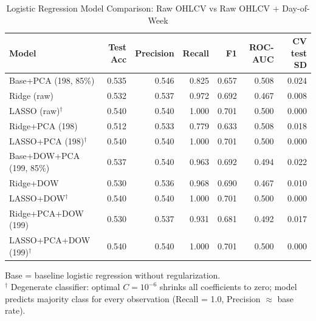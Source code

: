 \begin{table}[htbp]
\centering
\caption{Logistic Regression Model Comparison: Raw OHLCV vs Raw OHLCV + Day-of-Week}
\label{tab:base_logistic_comparison}
\begin{tabular}{lrrrrrr}
\toprule
Model & Test Acc & Precision & Recall & F1 & ROC-AUC & CV test SD \\
\midrule
Base+PCA (198, 85\%) & 0.535 & 0.546 & 0.825 & 0.657 & 0.508 & 0.024 \\
Ridge (raw) & 0.532 & 0.537 & 0.972 & 0.692 & 0.467 & 0.008 \\
LASSO (raw)$^\dagger$ & 0.540 & 0.540 & 1.000 & 0.701 & 0.500 & 0.000 \\
Ridge+PCA (198) & 0.512 & 0.533 & 0.779 & 0.633 & 0.508 & 0.018 \\
LASSO+PCA (198)$^\dagger$ & 0.540 & 0.540 & 1.000 & 0.701 & 0.500 & 0.000 \\
\midrule
Base+DOW+PCA (199, 85\%) & 0.537 & 0.540 & 0.963 & 0.692 & 0.494 & 0.022 \\
Ridge+DOW & 0.530 & 0.536 & 0.968 & 0.690 & 0.467 & 0.010 \\
LASSO+DOW$^\dagger$ & 0.540 & 0.540 & 1.000 & 0.701 & 0.500 & 0.000 \\
Ridge+PCA+DOW (199) & 0.530 & 0.537 & 0.931 & 0.681 & 0.492 & 0.017 \\
LASSO+PCA+DOW (199)$^\dagger$ & 0.540 & 0.540 & 1.000 & 0.701 & 0.500 & 0.000 \\
\bottomrule
\end{tabular}
\par\smallskip
\footnotesize Base = baseline logistic regression without regularization.
\\
\footnotesize $^\dagger$ Degenerate classifier: optimal $C = 10^{-6}$ shrinks all coefficients to zero; model predicts majority class for every observation (Recall = 1.0, Precision $\approx$ base rate).
\end{table}
